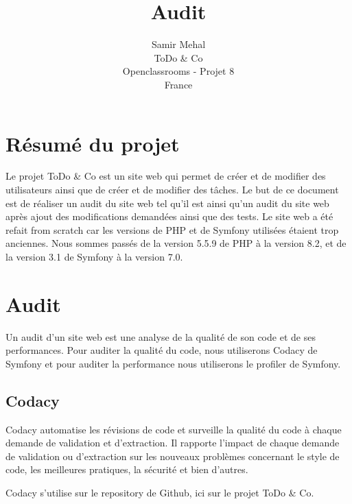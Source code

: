 \documentclass{article}
\title{Audit}
\author{Samir Mehal\\
  \small ToDo \& Co\\
  \small Openclassrooms - Projet 8\\
  \small France
}
\theoremstyle{definition}
\theoremstyle{remark}
\begin{document}
\maketitle


\newpage

\tableofcontents

\newpage




\section{Résumé du projet}

Le projet ToDo \& Co est un site web qui permet de créer et de modifier des utilisateurs ainsi que de créer et de modifier des tâches. Le but de ce document est de réaliser un audit du site web tel qu'il est ainsi qu'un audit du site web après ajout des modifications demandées ainsi que des tests. Le site web a été refait from scratch car les versions de PHP et de Symfony utilisées étaient trop anciennes. Nous sommes passés de la version 5.5.9 de PHP à la version 8.2, et de la version 3.1 de Symfony à la version 7.0.

\section{Audit}

Un audit d'un site web est une analyse de la qualité de son code et de ses performances. Pour auditer la qualité du code, nous utiliserons Codacy de Symfony et pour auditer la performance nous utiliserons le profiler de Symfony.

\subsection{Codacy}

Codacy automatise les révisions de code et surveille la qualité du code à chaque demande de validation et d'extraction. Il rapporte l'impact de chaque demande de validation ou d'extraction sur les nouveaux problèmes concernant le style de code, les meilleures pratiques, la sécurité et bien d'autres.

Codacy s'utilise sur le repository de Github, ici sur le projet ToDo \& Co.
\end{document}
